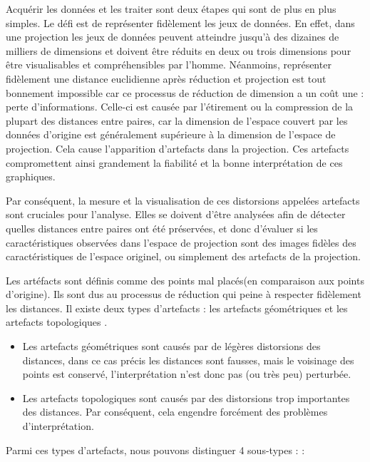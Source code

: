 Acquérir les données et les traiter sont deux étapes qui sont de plus en plus simples. Le défi est de représenter fidèlement les jeux de données. En effet, dans une projection les jeux de données peuvent atteindre jusqu’à des dizaines de milliers de dimensions et doivent être réduits en deux ou trois dimensions pour être visualisables et compréhensibles par l’homme. 
Néanmoins, représenter fidèlement une distance euclidienne après réduction et projection est tout bonnement impossible car ce processus de réduction de dimension a un coût une : perte d’informations.
Celle-ci est causée par l'étirement ou la compression de la plupart des distances entre paires, car la dimension de l'espace couvert par les données d'origine est généralement supérieure à la dimension de l'espace de projection. Cela cause l’apparition d’artefacts dans la projection. 
Ces artefacts compromettent ainsi grandement la fiabilité et la bonne interprétation de ces graphiques\cite{scarlet}. 


Par conséquent, la mesure et la visualisation de ces distorsions appelées artefacts sont cruciales pour l'analyse. Elles se doivent d'être analysées afin de détecter quelles distances entre paires ont été préservées, 
et donc d'évaluer si les caractéristiques observées dans l'espace de projection sont des images fidèles des caractéristiques de l'espace originel, ou simplement des artefacts de la projection.
\medskip

Les artéfacts sont définis comme des points mal placés(en comparaison aux points d’origine). Ils sont dus au processus de réduction qui peine à respecter fidèlement les distances. Il existe deux types d’artefacts : les artefacts géométriques et les artefacts topologiques \cite{HeulotAnEvaluation}.
\begin{itemize}
    \item Les artefacts géométriques sont causés par de légères distorsions des distances, dans ce cas précis les distances sont fausses, mais le voisinage des points est conservé,  l’interprétation n’est donc pas (ou très peu) perturbée.
    \item Les artefacts topologiques sont causés par des distorsions trop importantes des distances. Par conséquent, cela engendre forcément des problèmes d’interprétation.
\end{itemize}

Parmi ces types d'artefacts, nous pouvons distinguer 4 sous-types :\cite{aupetit2007visualizing} :


